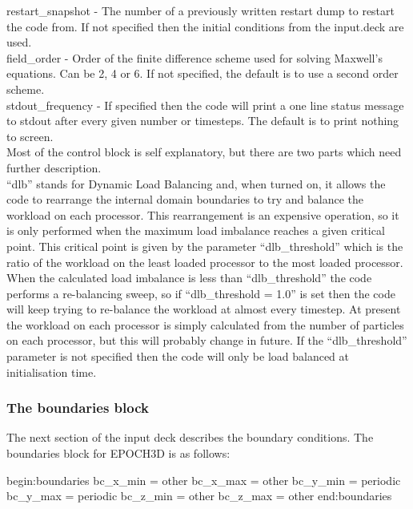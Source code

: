 {\emphtext restart\_snapshot} - The number of a previously written restart
dump to restart the code from. If not specified then the initial conditions
from the input.deck are used.\\

{\emphtext field\_order} - Order of the finite difference scheme used for
solving Maxwell's equations. Can be 2, 4 or 6. If not specified, the default
is to use a second order scheme.\\

{\emphtext stdout\_frequency} - If specified then the code will print a one
line status message to stdout after every given number or timesteps. The
default is to print nothing to screen.\\


Most of the control block is self explanatory, but there are two parts which
need further description. \\
``dlb'' stands for Dynamic Load Balancing and, when turned on, it allows the
code to rearrange the internal domain boundaries to try and balance the
workload on each processor. This rearrangement is an expensive operation, so
it is only performed when the maximum load imbalance reaches a given critical
point. This critical point is given by the parameter ``dlb\_threshold'' which
is the ratio of the workload on the least loaded processor to the most loaded
processor. When the calculated load imbalance is less than ``dlb\_threshold''
the code performs a re-balancing sweep, so if ``dlb\_threshold = 1.0'' is set
then the code will keep trying to re-balance the workload at almost every
timestep. At present the workload on each processor is simply calculated from
the number of particles on each processor, but this will probably change in
future. If the ``dlb\_threshold'' parameter is not specified then the code
will only be load balanced at initialisation time.\\

\subsubsection{The boundaries block}
The next section of the input deck describes the boundary conditions. The
boundaries block for EPOCH3D is as follows:
\begin{boxverbatim}
begin:boundaries
   bc_x_min = other
   bc_x_max = other
   bc_y_min = periodic
   bc_y_max = periodic
   bc_z_min = other
   bc_z_max = other
end:boundaries
\end{boxverbatim}

